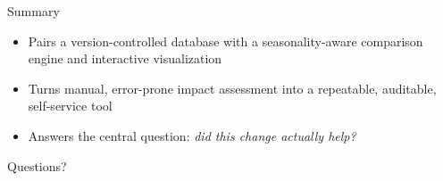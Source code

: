 \documentclass[aspectratio=169]{beamer}
\begin{document}
\begin{frame}{Summary}
    \begin{itemize}
        \item Pairs a version-controlled database with a
              seasonality-aware comparison engine and interactive
              visualization
        \item Turns manual, error-prone impact assessment into a
              repeatable, auditable, self-service tool
        \item Answers the central question: \emph{did this change
              actually help?}
    \end{itemize}
\end{frame}

\begin{frame}
    \centering
    \Huge  Questions?
   \vspace{1em}
  \end{frame}
\end{document}

